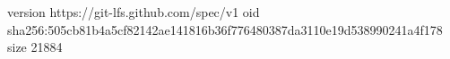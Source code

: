 version https://git-lfs.github.com/spec/v1
oid sha256:505cb81b4a5cf82142ae141816b36f776480387da3110e19d538990241a4f178
size 21884
